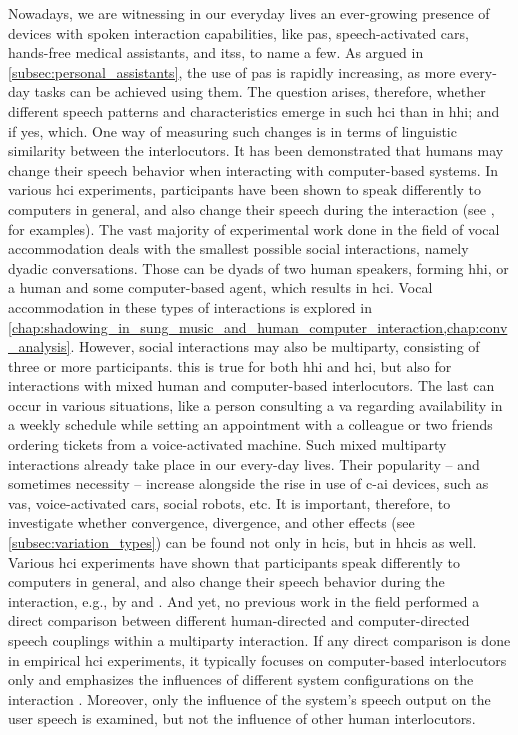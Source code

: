 Nowadays, we are witnessing in our everyday lives an ever-growing presence of devices with spoken interaction capabilities, like \acp{pa}, speech-activated cars, hands-free medical assistants, and \acp{its}, to name a few.
As argued in \cref{subsec:personal_assistants}, the use of \acp{pa} is rapidly increasing, as more every-day tasks can be achieved using them.
The question arises, therefore, whether different speech patterns and characteristics emerge in such \ac{hci} than in \ac{hhi}; and if yes, which.
One way of measuring such changes is in terms of linguistic similarity between the interlocutors.
It has been demonstrated that humans may change their speech behavior when interacting with computer-based systems.
In various \ac{hci} experiments, participants have been shown to speak differently to computers in general, and also change their speech during the interaction (see \citet{Branigan2010linguistic}, for examples).
The vast majority of experimental work done in the field of vocal accommodation deals with the smallest possible social interactions, namely dyadic conversations.
Those can be dyads of two human speakers, forming \ac{hhi}, or a human and some computer-based agent, which results in \ac{hci}.
Vocal accommodation in these types of interactions is explored in \cref{chap:shadowing_in_sung_music_and_human_computer_interaction,chap:conv_analysis}.
However, social interactions may also be multiparty, consisting of three or more participants.
this is true for both \ac{hhi} and \ac{hci}, but also for interactions with mixed human and computer-based interlocutors.
The last can occur in various situations, like a person consulting a \ac{va} regarding availability in a weekly schedule while setting an appointment with a colleague or two friends ordering tickets from a voice-activated machine.
Such mixed multiparty interactions already take place in our every-day lives.
Their popularity -- and sometimes necessity -- increase alongside the rise in use of \ac{c-ai} devices, such as \acp{va}, voice-activated cars, social robots, etc.
It is important, therefore, to investigate whether convergence, divergence, and other effects (see \cref{subsec:variation_types}) can be found not only in \aclp{hci}, but in \acp{hhci} as well.
Various \ac{hci} experiments have shown that participants speak differently to computers in general, and also change their speech behavior during the interaction, e.g., by \citet{Branigan2010linguistic} and \citet{Levitan2016implementing}.
And yet, no previous work in the field performed a direct comparison between different human-directed and computer-directed speech couplings within a multiparty interaction.
If any direct comparison is done in empirical \ac{hci} experiments, it typically focuses on computer-based interlocutors only and emphasizes the influences of different system configurations on the interaction \citep[e.g.,][]{Levitan2016implementing}.
Moreover, only the influence of the system's speech output on the user speech is examined, but not the influence of other human interlocutors.

